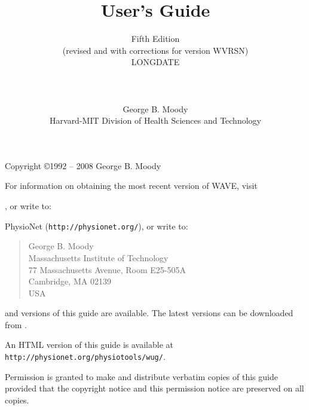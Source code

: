 \documentclass[twoside]{book}
\title{\WAVE{} User's Guide}
\author{Fifth Edition\\
(revised and with corrections for \WAVE{} version WVRSN)\\
LONGDATE\\
\\
\\
\\
George B. Moody\\
Harvard-MIT Division of Health Sciences and Technology}
\date{}
\newcommand{\WAVE}{{\sf WAVE}\xspace}
\begin{document}
\begin{htmlonly}
\end{htmlonly}
\begin{latexonly}
\end{latexonly}

\maketitle

\pagestyle{empty}
\vspace*{\fill}
\noindent
Copyright \copyright 1992 -- 2008 George B. Moody

\vspace{1 in}
\noindent
For information on obtaining the most recent version of \WAVE{},
visit
\begin{htmlonly}
, or write to:
\end{htmlonly}
\begin{latexonly}
PhysioNet ({\tt http://physionet.org/}), or write to:
\end{latexonly}

\begin{quote}
George B. Moody\\
Massachusetts Institute of Technology\\
77 Massachusetts Avenue, Room E25-505A\\
Cambridge, MA 02139\\
USA\\
\end{quote}

\begin{htmlonly}
\noindent
{} and
 versions of this guide are available.
The latest versions can be downloaded from
.
\end{htmlonly}
\begin{latexonly}
\noindent
An HTML version of this guide is available at
{\tt http://physio\-net.\-org/\-physio\-tools/\-wug/}.
\end{latexonly}

\vspace{0.2 in}
\noindent
Permission is granted to make and distribute verbatim copies of this
guide provided that the copyright notice and this permission notice are
preserved on all copies.
\end{document}
